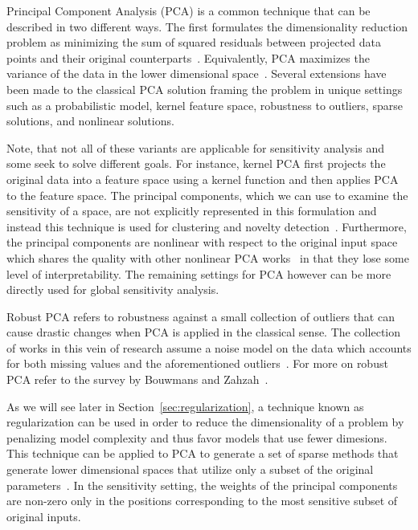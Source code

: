 Principal Component Analysis (PCA) is a common technique that can be described in two different ways.
%
The first formulates the dimensionality reduction problem as minimizing the sum of squared residuals between projected data points and their original counterparts~\cite{Pearson1901}.
%
Equivalently, PCA maximizes the variance of the data in the lower dimensional space~\cite{Hotelling1933}.
%
Several extensions have been made to the classical PCA solution framing the problem in unique settings such as a probabilistic model, kernel feature space, robustness to outliers, sparse solutions, and nonlinear solutions.

Note, that not all of these variants are applicable for sensitivity analysis and some seek to solve different goals.
%
For instance, kernel PCA first projects the original data into a feature space using a kernel function and then applies PCA to the feature space.
%
The principal components, which we can use to examine the sensitivity of a space, are not explicitly represented in this formulation and instead this technique is used for clustering and novelty detection~\cite{ScholkopfSmolaMuller1997}.
%
Furthermore, the principal components are nonlinear with respect to the original input space~\cite{BishopNasrabadi2006} which shares the quality with other nonlinear PCA works~\cite{CollinsDasguptaSchapire2001,MohamedGhahramaniHeller2009,HyvarinenKarhunenOja2001} in that they lose some level of interpretability.
%
The remaining settings for PCA however can be more directly used for global sensitivity analysis.

Robust PCA refers to robustness against a small collection of outliers that can cause drastic changes when PCA is applied in the classical sense.
%
The collection of works in this vein of research assume a noise model on the data which accounts for both missing values and the aforementioned outliers~\cite{CandesLiMa2011,Choulakian2006,GalpinHawkins1987}.
%
For more on robust PCA refer to the survey by Bouwmans and Zahzah~\cite{BouwmansZahzah2014}.

As we will see later in Section~\ref{sec:regularization}, a technique known as regularization can be used in order to reduce the dimensionality of a problem by penalizing model complexity and thus favor models that use fewer dimesions.
%
This technique can be applied to PCA to generate a set of sparse methods that generate lower dimensional spaces that utilize only a subset of the original parameters~\cite{dAspremontBachGhaoui2008,dAspremontGhaouiJordan2007,JourneeNesterovRichtarik2010,ZouHastieTibshirani2006}.
%
In the sensitivity setting, the weights of the principal components are non-zero only in the positions corresponding to the most sensitive subset of original inputs.

